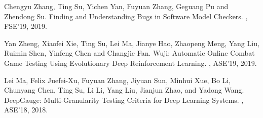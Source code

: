 \documentclass[a4paper]{article}
\begin{document}
\begin{thebibliography}{99}
	\newblock Chengyu Zhang, Ting Su, Yichen Yan, Fuyuan Zhang, Geguang Pu and Zhendong Su.  
	\newblock Finding and Understanding Bugs in Software Model Checkers.  
	, FSE'19, 2019. 
	
	\newblock Yan Zheng, Xiaofei Xie, Ting Su, Lei Ma, Jianye Hao, Zhaopeng Meng, Yang Liu, Ruimin Shen, Yinfeng Chen and Changjie Fan.
	\newblock Wuji: Automatic Online Combat Game Testing Using Evolutionary Deep Reinforcement Learning.
	, ASE'19, 2019. 
	
	\newblock Lei Ma, Felix Juefei-Xu, Fuyuan Zhang, Jiyuan Sun, Minhui Xue, Bo Li, Chunyang Chen, Ting Su, Li Li, Yang Liu, Jianjun Zhao, and Yadong Wang.
	\newblock DeepGauge: Multi-Granularity Testing Criteria for Deep Learning Systems.
	, ASE'18, 2018. 
	
\end{thebibliography}
\end{document}
